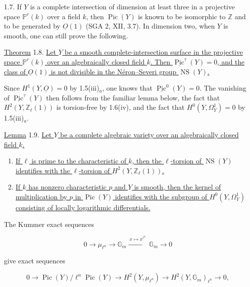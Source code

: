 1.7. If $Y$ is a complete intersection of dimension at least three in a
projective space $\mathbb P^r(k)$ over a field $k$, then
$\operatorname{Pic}(Y)$ is known to be isomorphic to $\mathbb Z$ and to be
generated by $\underline O(1)$ (SGA 2, XII, 3.7).  In dimension two, when
$Y$ is smooth, one can still prove the following.

\underline{Theorem} 1.8. \underline{Let $Y$ be a smooth complete-intersection
surface in the projective space $\mathbb P^r(k)$ over an algebraically
closed field $k$.  Then $\underline{\operatorname{Pic}}^\tau(Y)=0$, and the
class of $\underline O(1)$ is not divisible in the Néron--Severi group
$\operatorname{NS}(Y)$.}

Since $H^1(Y,\underline O)=0$ by 1.5(iii)$_a$, one knows that
$\underline{\operatorname{Pic}}^0(Y)=0$.  The vanishing of
$\underline{\operatorname{Pic}}^\tau(Y)$ then follows from the familiar
lemma below, the fact that $H^2(Y,\mathbb Z_\ell(1))$ is torsion-free by
1.6(iv), and the fact that $H^0(Y,\Omega_Y^1)=0$ by 1.5(iii)$_a$.

\underline{Lemma} 1.9. \underline{Let $Y$ be a complete algebraic variety
over an algebraically closed field $k$.}

\begin{enumerate}[label=(\roman*),leftmargin=2.6em]
\item \underline{If $\ell$ is prime to the characteristic of $k$, then the
$\ell$-torsion of $\operatorname{NS}(Y)$ identifies with the $\ell$-torsion
of $H^2(Y,\mathbb Z_\ell(1))$.}


\item \underline{If $k$ has nonzero characteristic $p$ and $Y$ is smooth,
then the kernel of multiplication by $p$ in $\operatorname{Pic}(Y)$
identifies with the subgroup of $H^0(Y,\Omega_Y^1)$ consisting of locally
logarithmic differentials.}
\end{enumerate}

The Kummer exact sequences

\begin{equation*}
0\longrightarrow\mu_{\ell^n}\longrightarrow\mathbb G_m
\xrightarrow{\ x\mapsto x^{\ell^n}\ }\mathbb G_m\longrightarrow0
\end{equation*}

give exact sequences

\begin{equation*}
0\longrightarrow
\operatorname{Pic}(Y)/\ell^n\operatorname{Pic}(Y)
\longrightarrow H^2(Y,\mu_{\ell^n})
\longrightarrow H^2(Y,\mathbb G_m)_{\ell^n}
\longrightarrow0,
\end{equation*}


